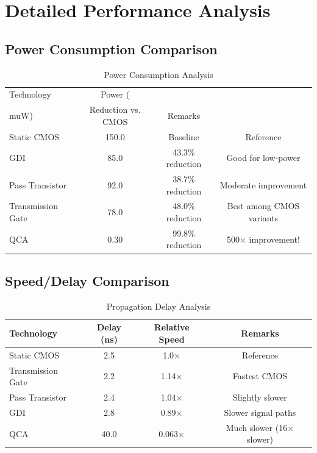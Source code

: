 \documentclass[12pt,a4paper,twoside]{report}
\begin{document}
\section{Detailed Performance Analysis}

\subsection{Power Consumption Comparison}

\begin{table}[H]
\centering
\caption{Power Consumption Analysis}
\label{tab:power_analysis}
\begin{tabularx}{\textwidth}{lccc}
\toprule
Technology & Power (\\muW) & Reduction vs. CMOS & Remarks \\
\midrule
Static CMOS & 150.0 & Baseline & Reference \\
GDI & 85.0 & 43.3\% reduction & Good for low-power \\
Pass Transistor & 92.0 & 38.7\% reduction & Moderate improvement \\
Transmission Gate & 78.0 & 48.0\% reduction & Best among CMOS variants \\
QCA & 0.30 & 99.8\% reduction & 500× improvement! \\
\bottomrule
\end{tabularx}
\end{table}

\subsection{Speed/Delay Comparison}

\begin{table}[H]
\centering
\caption{Propagation Delay Analysis}
\label{tab:delay_analysis}
\begin{tabularx}{\textwidth}{lccc}
\toprule
Technology & Delay (ns) & Relative Speed & Remarks \\
\midrule
Static CMOS & 2.5 & 1.0× & Reference \\
Transmission Gate & 2.2 & 1.14× & Fastest CMOS \\
Pass Transistor & 2.4 & 1.04× & Slightly slower \\
GDI & 2.8 & 0.89× & Slower signal paths \\
QCA & 40.0 & 0.063× & Much slower (16× slower) \\
\bottomrule
\end{tabularx}
\end{table}
\end{document}
